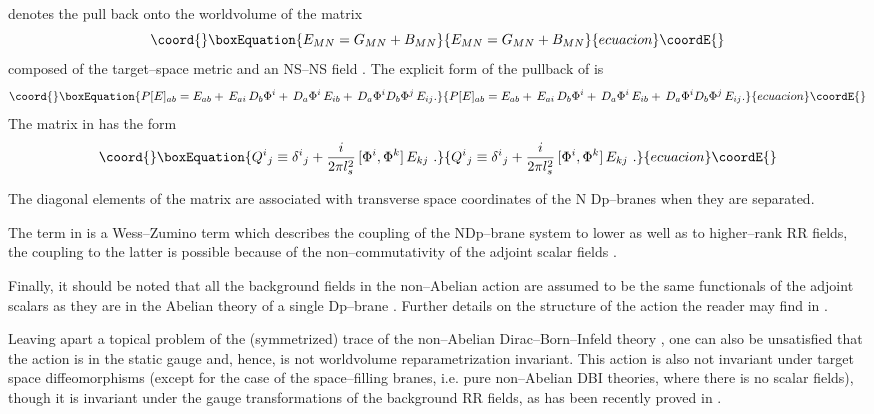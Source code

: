 \documentclass[a4paper,12pt]{article}
\begin{document}
\coordHE{} denotes the pull back onto the worldvolume of the matrix
\begin{equation}\coord{}\boxEquation{\label{E}
E_{MN}=G_{MN}+B_{MN}
}{E_{MN}=G_{MN}+B_{MN}
}{ecuacion}\coordE{}\end{equation}
composed of the target--space metric \coordHE{} and an NS--NS field
\coordHE{}. The explicit form of the pullback
\coordHE{} of \coordHE{}
 is
\begin{equation}\coord{}\boxEquation{\label{PE}
P[E]_{ab}=E_{ab}+\,E_{ai}\,D_{b}\Phi^i+\,D_{a}\Phi^i\,E_{ib}+
\,D_a\Phi^iD_b\Phi^j\,E_{ij} .
}{P[E]_{ab}=E_{ab}+\,E_{ai}\,D_{b}\Phi^i+\,D_{a}\Phi^i\,E_{ib}+
\,D_a\Phi^iD_b\Phi^j\,E_{ij} .
}{ecuacion}\coordE{}\end{equation}
The matrix \coordHE{} in  has the form
\begin{equation}\coord{}\boxEquation{\label{2}
Q^i{}_j\equiv\delta^i{}_j+{i\over{2\pi l^2_s}}\,[\Phi^i,\Phi^k]\,E_{kj}\ .
}{Q^i{}_j\equiv\delta^i{}_j+{i\over{2\pi l^2_s}}\,[\Phi^i,\Phi^k]\,E_{kj}\ .
}{ecuacion}\coordE{}\end{equation}

The diagonal elements of the \coordHE{} matrix \coordHE{} are
associated with transverse space coordinates of the N Dp--branes
when they are separated.

The term \coordHE{}  in  is a Wess--Zumino term which describes
the coupling of the NDp--brane system to lower as well as to
higher--rank RR fields, the coupling to the latter is possible
because of the non--commutativity of the adjoint scalar fields
\coordHE{} \cite{Myers:1999ps,Taylor:2000pr}.

Finally, it should be noted that all the background fields in the
non--Abelian action  are assumed to be the same functionals
of the adjoint scalars \coordHE{} as they are in the Abelian theory
of a single Dp--brane \cite{douglas,hull}. Further details on the
structure of the action
 the reader may find in \cite{Myers:1999ps}.

Leaving apart a topical problem of the (symmetrized) trace of
the non--Abelian Dirac--Born--Infeld theory
\cite{Tseytlin:1997cs}, one can also be unsatisfied that the
action  is in the static gauge and, hence, is not worldvolume
reparametrization invariant. This action is also not invariant
under target space diffeomorphisms (except for the case of the
space--filling branes, i.e. pure non--Abelian DBI theories, where
there is no scalar fields), though it is invariant under the gauge
transformations of the background RR fields, as has been recently
proved in
\cite{ciocarlie}.
\end{document}
